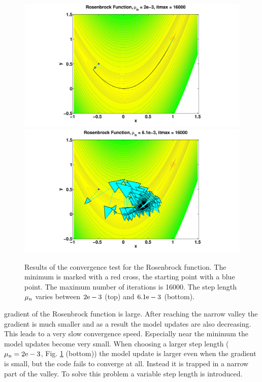 \begin{figure}
\begin{center}
\includegraphics[width=15cm]{figures/Rosenbrock_1.pdf}\\
\includegraphics[width=15cm]{figures/Rosenbrock_2.pdf}\\
\caption{Results of the convergence test for the Rosenbrock function. The minimum is marked with a red cross, the starting point with a blue point. The maximum number of iterations is 16000. The step length $\rm{\mu_n}$ varies between $\rm{2e-3}$ (top) and $\rm{6.1e-3}$ (bottom).}
\label{Rosenbrock_constant}
\end{center}
\end{figure}
gradient of the Rosenbrock function is large. After reaching the narrow valley the gradient is much smaller and as a result the model updates are also decreasing. This leads to a very slow convergence speed. Especially near the minimum the model updates become very small. When choosing a larger step length ($\rm{\mu_n=2e-3}$, Fig. \ref{Rosenbrock_constant} (bottom)) the model update is larger even when the gradient is small, but the code fails to converge at all. Instead it is trapped in a narrow part of the valley. To solve this problem a variable step length is introduced.
